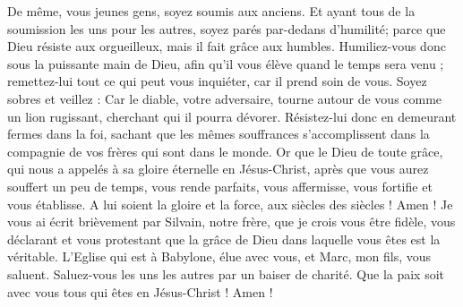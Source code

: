 \begin{multicols}{2}
De même, vous jeunes gens, soyez soumis aux anciens. Et ayant tous de la soumission les uns pour les autres, soyez parés par-dedans d'humilité; parce que Dieu résiste aux orgueilleux, mais il fait grâce aux humbles. 
Humiliez-vous donc sous la puissante main de Dieu, afin qu'il vous élève quand le temps sera venu ;
remettez-lui tout ce qui peut vous inquiéter, car il prend soin de vous.
Soyez sobres et veillez : Car le diable, votre adversaire, tourne autour de vous comme un lion rugissant, cherchant qui il pourra dévorer. 
Résistez-lui donc en demeurant fermes dans la foi, sachant que les mêmes souffrances s'accomplissent dans la compagnie de vos frères qui sont dans le monde. 
Or que le Dieu de toute grâce, qui nous a appelés à sa gloire éternelle en Jésus-Christ, après que vous aurez souffert un peu de temps, vous rende parfaits, vous affermisse, vous fortifie et vous établisse. 
A lui soient la gloire et la force, aux siècles des siècles ! Amen !
Je vous ai écrit brièvement par Silvain, notre frère, que je crois vous être fidèle, vous déclarant et vous protestant que la grâce de Dieu dans laquelle vous êtes est la véritable. 
L'Eglise qui est à Babylone, élue avec vous, et Marc, mon fils, vous saluent. 
Saluez-vous les uns les autres par un baiser de charité. Que la paix soit avec vous tous qui êtes en Jésus-Christ ! Amen !
\PPE{}
\end{multicols}
